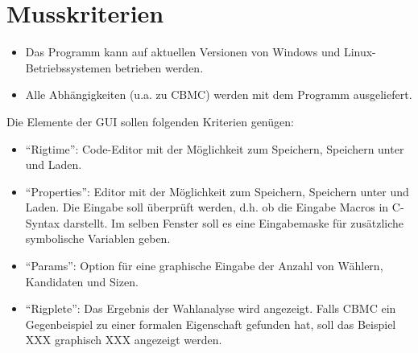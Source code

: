 \documentclass[a4paper]{scrreprt}
\begin{document}
\section{Musskriterien}
\begin{itemize}
\item Das Programm kann auf aktuellen Versionen von Windows und Linux-Betriebssystemen betrieben werden.
\item Alle Abhängigkeiten (u.a. zu CBMC) werden mit dem Programm ausgeliefert.
\end{itemize}
Die Elemente der \ac{GUI} sollen folgenden Kriterien genügen:
\begin{itemize}
\item "`Rigtime"': Code-Editor mit der Möglichkeit zum Speichern, Speichern unter und Laden.
\item "`Properties"': Editor mit der Möglichkeit zum Speichern, Speichern unter und Laden. Die Eingabe soll überprüft werden, d.h. ob die Eingabe Macros in C-Syntax darstellt. Im selben Fenster soll es eine Eingabemaske für zusätzliche symbolische Variablen geben.
\item "`Params"': Option für eine graphische Eingabe der Anzahl von Wählern, Kandidaten und Sizen.
\item "`Rigplete"': Das Ergebnis der Wahlanalyse wird angezeigt. Falls CBMC ein Gegenbeispiel zu einer formalen Eigenschaft gefunden hat, soll das Beispiel XXX graphisch XXX angezeigt werden.
\end{itemize}
\end{document}

